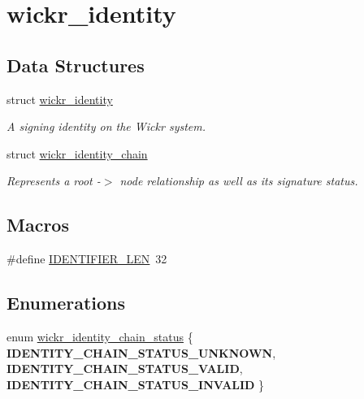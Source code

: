 \hypertarget{group__wickr__identity}{}\section{wickr\+\_\+identity}
\label{group__wickr__identity}
\subsection*{Data Structures}
\begin{DoxyCompactItemize}
\item 
struct \mbox{\hyperlink{structwickr__identity}{wickr\+\_\+identity}}
\begin{DoxyCompactList}\small\item\em A signing identity on the Wickr system. \end{DoxyCompactList}\item 
struct \mbox{\hyperlink{structwickr__identity__chain}{wickr\+\_\+identity\+\_\+chain}}
\begin{DoxyCompactList}\small\item\em Represents a root -\/$>$ node relationship as well as it\textquotesingle{}s signature status. \end{DoxyCompactList}\end{DoxyCompactItemize}
\subsection*{Macros}
\begin{DoxyCompactItemize}
\item 
\#define \mbox{\hyperlink{group__wickr__identity_ga43bd60836203349a1c745d0d29bf7706}{I\+D\+E\+N\+T\+I\+F\+I\+E\+R\+\_\+\+L\+EN}}~32
\end{DoxyCompactItemize}
\subsection*{Enumerations}
\begin{DoxyCompactItemize}
\item 
enum \mbox{\hyperlink{group__wickr__identity_ga78aefa3835eb13ca75c0129583b5ebfa}{wickr\+\_\+identity\+\_\+chain\+\_\+status}} \{ {\bfseries I\+D\+E\+N\+T\+I\+T\+Y\+\_\+\+C\+H\+A\+I\+N\+\_\+\+S\+T\+A\+T\+U\+S\+\_\+\+U\+N\+K\+N\+O\+WN}, 
{\bfseries I\+D\+E\+N\+T\+I\+T\+Y\+\_\+\+C\+H\+A\+I\+N\+\_\+\+S\+T\+A\+T\+U\+S\+\_\+\+V\+A\+L\+ID}, 
{\bfseries I\+D\+E\+N\+T\+I\+T\+Y\+\_\+\+C\+H\+A\+I\+N\+\_\+\+S\+T\+A\+T\+U\+S\+\_\+\+I\+N\+V\+A\+L\+ID}
 \}
\end{DoxyCompactItemize}
